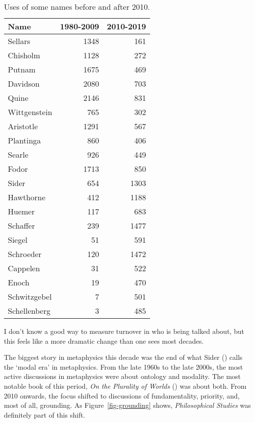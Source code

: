 \documentclass[
  10pt,
  letterpaper,
  DIV=11,
  numbers=noendperiod,
  twoside]{scrartcl}
\begin{document}
\begin{longtable}[]{@{}lrr@{}}

\caption{\label{tbl-names-early-late}Uses of some names before and after
2010.}

\tabularnewline

\toprule\noalign{}
Name & 1980-2009 & 2010-2019 \\
\midrule\noalign{}
\endhead
\bottomrule\noalign{}
\endlastfoot
Sellars & 1348 & 161 \\
Chisholm & 1128 & 272 \\
Putnam & 1675 & 469 \\
Davidson & 2080 & 703 \\
Quine & 2146 & 831 \\
Wittgenstein & 765 & 302 \\
Aristotle & 1291 & 567 \\
Plantinga & 860 & 406 \\
Searle & 926 & 449 \\
Fodor & 1713 & 850 \\
Sider & 654 & 1303 \\
Hawthorne & 412 & 1188 \\
Huemer & 117 & 683 \\
Schaffer & 239 & 1477 \\
Siegel & 51 & 591 \\
Schroeder & 120 & 1472 \\
Cappelen & 31 & 522 \\
Enoch & 19 & 470 \\
Schwitzgebel & 7 & 501 \\
Schellenberg & 3 & 485 \\

\end{longtable}

I don't know a good way to measure turnover in who is being talked
about, but this feels like a more dramatic change than one sees most
decades.

The biggest story in metaphysics this decade was the end of what Sider
() calls the `modal era' in metaphysics.
From the late 1960s to the late 2000s, the most active discussions in
metaphysics were about ontology and modality. The most notable book of
this period, \emph{On the Plurality of Worlds}
() was about both. From 2010
onwards, the focus shifted to discussions of fundamentality, priority,
and, most of all, grounding. As Figure~\ref{fig-grounding} shows,
\emph{Philosophical Studies} was definitely part of this shift.
\end{document}
